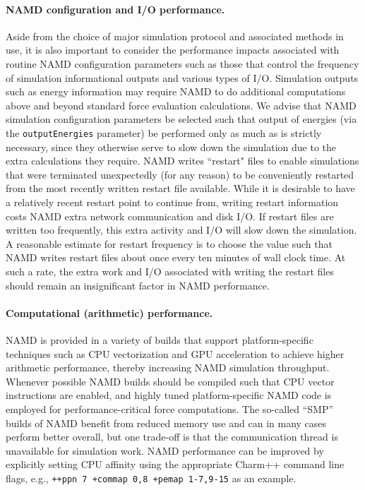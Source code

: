 \paragraph{NAMD configuration and I/O performance.}
Aside from the choice of major simulation protocol and associated
methods in use, it is also important to consider the performance impacts
associated with routine NAMD configuration parameters such as those
that control the frequency of simulation informational outputs and 
various types of I/O.
Simulation outputs such as energy information may require NAMD to do additional
computations above and beyond standard force evaluation calculations.
We advise that NAMD simulation configuration parameters be selected such
that output of energies (via the \texttt{outputEnergies} parameter) 
be performed only as much as is strictly necessary, since 
they otherwise serve to slow down the simulation due to the extra
calculations they require.  
NAMD writes ``restart" files to enable simulations that were terminated 
unexpectedly (for any reason) to be conveniently restarted from the 
most recently written restart file available.  While it is desirable
to have a relatively recent restart point to continue from, writing
restart information costs NAMD extra network communication and disk I/O.
If restart files are written too frequently, this extra activity and I/O
will slow down the simulation.  A reasonable estimate for restart
frequency is to choose the value such that NAMD writes restart files
about once every ten minutes of wall clock time.  
At such a rate, the extra work and I/O associated with writing
the restart files should remain an insignificant factor in NAMD performance.

\paragraph{Computational (arithmetic) performance.}
NAMD is provided in a variety of builds that support platform-specific
techniques such as CPU vectorization and GPU acceleration 
to achieve higher arithmetic performance, thereby increasing 
NAMD simulation throughput.  
Whenever possible NAMD builds should be compiled such that 
CPU vector instructions are enabled, and highly tuned
platform-specific NAMD code is employed for performance-critical 
force computations.
The so-called ``SMP'' builds of NAMD benefit from reduced memory use 
and can in many cases perform better overall, but one trade-off 
is that the communication thread is unavailable for simulation work.
NAMD performance can be improved by explicitly setting CPU affinity
using the appropriate Charm++ command line flags, e.g., 
\texttt{++ppn 7 +commap 0,8 +pemap 1-7,9-15} as an example.

